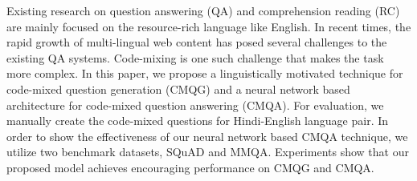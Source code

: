 Existing research on question answering (QA) and comprehension reading (RC) are mainly focused on the resource-rich language like English. In recent times, the rapid growth of multi-lingual web content has posed several challenges to the existing QA systems. Code-mixing is one such challenge that makes the task more complex. In this paper, we propose a linguistically motivated technique for code-mixed question generation (CMQG) and a neural network based architecture for code-mixed question answering (CMQA). For evaluation, we manually create the code-mixed questions for Hindi-English language pair. In order to show the effectiveness of our neural network based CMQA technique, we utilize two benchmark datasets, SQuAD and MMQA. Experiments show that our proposed model achieves encouraging performance on CMQG and CMQA.
